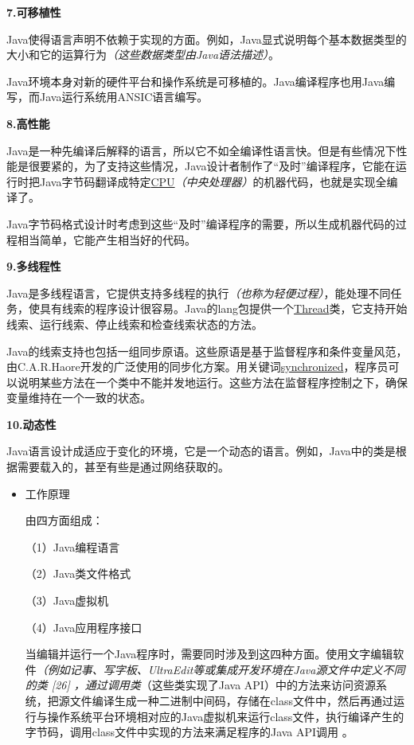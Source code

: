 \documentclass[
]{article}
\begin{document}
\textbf{7.可移植性}

Java使得语言声明不依赖于实现的方面。例如，Java显式说明每个基本数据类型的大小和它的运算行为\emph{（这些数据类型由Java语法描述）}。

Java环境本身对新的硬件平台和操作系统是可移植的。Java编译程序也用Java编写，而Java运行系统用ANSIC语言编写。

\textbf{8.高性能}

Java是一种先编译后解释的语言，所以它不如全编译性语言快。但是有些情况下性能是很要紧的，为了支持这些情况，Java设计者制作了``及时''编译程序，它能在运行时把Java字节码翻译成特定\href{https://baike.baidu.com/item/CPU}{CPU}\emph{（中央处理器）}的机器代码，也就是实现全编译了。

Java字节码格式设计时考虑到这些``及时''编译程序的需要，所以生成机器代码的过程相当简单，它能产生相当好的代码。

\textbf{9.多线程性}

Java是多线程语言，它提供支持多线程的执行\emph{（也称为轻便过程）}，能处理不同任务，使具有线索的程序设计很容易。Java的lang包提供一个\href{https://baike.baidu.com/item/Thread/5156974}{Thread}类，它支持开始线索、运行线索、停止线索和检查线索状态的方法。

Java的线索支持也包括一组同步原语。这些原语是基于监督程序和条件变量风范，由C.A.R.Haore开发的广泛使用的同步化方案。用关键词\href{https://baike.baidu.com/item/synchronized}{synchronized}，程序员可以说明某些方法在一个类中不能并发地运行。这些方法在监督程序控制之下，确保变量维持在一个一致的状态。

\textbf{10.动态性}

Java语言设计成适应于变化的环境，它是一个动态的语言。例如，Java中的类是根据需要载入的，甚至有些是通过网络获取的。

\begin{itemize}
\item
  工作原理

  由四方面组成：

  （1）Java编程语言

  （2）Java类文件格式

  （3）Java虚拟机

  （4）Java应用程序接口

  当编辑并运行一个Java程序时，需要同时涉及到这四种方面。使用文字编辑软件\emph{（例如记事、写字板、UltraEdit等或集成开发环境在Java源文件中定义不同的类
  {[}26{]} ，通过调用类}（这些类实现了Java
  API）中的方法来访问资源系统，把源文件编译生成一种二进制中间码，存储在class文件中，然后再通过运行与操作系统平台环境相对应的Java虚拟机来运行class文件，执行编译产生的字节码，调用class文件中实现的方法来满足程序的Java
  API调用 。
\end{itemize}
\end{document}
